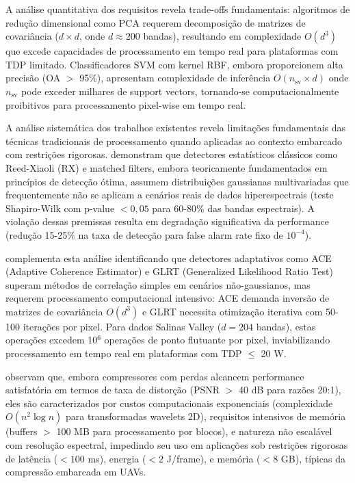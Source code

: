 A análise quantitativa dos requisitos revela trade-offs fundamentais: 
algoritmos de redução dimensional como PCA requerem decomposição de matrizes 
de covariância ($d \times d$, onde $d \approx 200$ bandas), resultando em 
complexidade $O(d^3)$ que excede capacidades de processamento em tempo real 
para plataformas com TDP limitado. Classificadores SVM com kernel RBF, embora 
proporcionem alta precisão (OA $>$ 95\%), apresentam complexidade de inferência 
$O(n_{\text{sv}} \times d)$ onde $n_{\text{sv}}$ pode exceder milhares de 
support vectors, tornando-se computacionalmente proibitivos para processamento 
pixel-wise em tempo real.

A análise sistemática dos trabalhos existentes revela limitações fundamentais 
das técnicas tradicionais de processamento quando aplicadas ao contexto 
embarcado com restrições rigorosas. \textcite{Manolakis2002} demonstram que 
detectores estatísticos clássicos como Reed-Xiaoli (RX) e matched filters, 
embora teoricamente fundamentados em princípios de detecção ótima, assumem 
distribuições gaussianas multivariadas que frequentemente não se aplicam a 
cenários reais de dados hiperespectrais (teste Shapiro-Wilk com p-value $< 0{,}05$ 
para 60-80\% das bandas espectrais). A violação dessas premissas resulta em 
degradação significativa da performance (redução 15-25\% na taxa de detecção 
para false alarm rate fixo de $10^{-4}$).

\textcite{Nasrabadi2014} complementa esta análise identificando que detectores 
adaptativos como ACE (Adaptive Coherence Estimator) e GLRT (Generalized 
Likelihood Ratio Test) superam métodos de correlação simples em cenários 
não-gaussianos, mas requerem processamento computacional intensivo: ACE 
demanda inversão de matrizes de covariância $O(d^3)$ e GLRT necessita 
otimização iterativa com 50-100 iterações por pixel. Para dados Salinas 
Valley ($d = 204$ bandas), estas operações excedem 10$^6$ operações de 
ponto flutuante por pixel, inviabilizando processamento em tempo real em 
plataformas com TDP $\leq$ 20 W.

\textcite{Diaz2019} observam que, embora compressores com perdas alcancem 
performance satisfatória em termos de taxa de distorção (PSNR $>$ 40 dB 
para razões 20:1), eles são caracterizados por custos computacionais 
exponenciais (complexidade $O(n^2 \log n)$ para transformadas wavelets 2D), 
requisitos intensivos de memória (buffers $>$ 100 MB para processamento 
por blocos), e natureza não escalável com resolução espectral, impedindo 
seu uso em aplicações sob restrições rigorosas de latência ($< 100$ ms), 
energia ($< 2$ J/frame), e memória ($< 8$ GB), típicas da compressão 
embarcada em UAVs.

